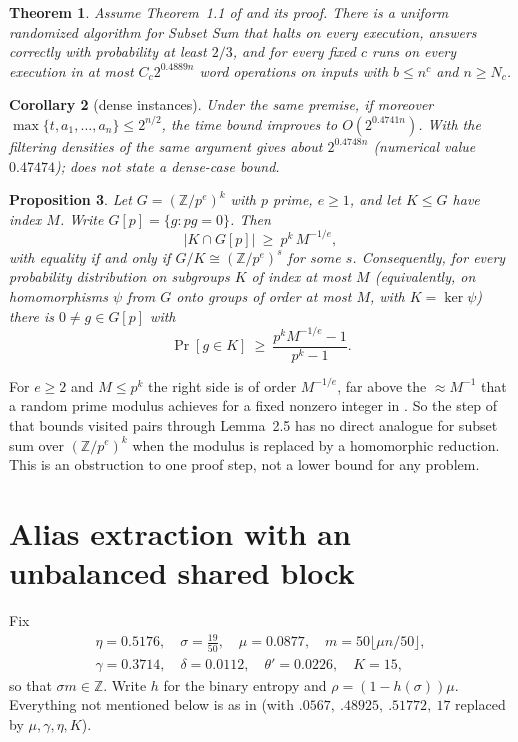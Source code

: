 \documentclass[11pt]{amsart}
\newtheorem{theorem}{Theorem}[section]
\newtheorem{proposition}[theorem]{Proposition}
\newtheorem{corollary}[theorem]{Corollary}
\theoremstyle{remark}
\newcommand{\Z}{\mathbb Z}
\begin{document}
\begin{theorem}\label{thm:main}
Assume Theorem~1.1 of \cite{oai} and its proof. There is a uniform randomized algorithm for Subset
Sum that halts on every execution, answers correctly with probability at least $2/3$, and for every
fixed $c$ runs on every execution in at most $C_c2^{0.4889n}$ word operations on inputs with $b\le n^c$
and $n\ge N_c$.
\end{theorem}

\begin{corollary}[dense instances]\label{cor:dense}
Under the same premise, if moreover $\max\{t,a_1,\dots,a_n\}\le2^{n/2}$, the time bound improves to
$O(2^{0.4741n})$. With the filtering densities of \cite{oai} the same argument gives about
$2^{0.4748n}$ (numerical value $0.47474$); \cite{oai} does not state a dense-case bound.
\end{corollary}

\begin{proposition}\label{prop:C}
Let $G=(\Z/p^e)^k$ with $p$ prime, $e\ge1$, and let $K\le G$ have index $M$. Write
$G[p]=\{g:pg=0\}$. Then
\[
|K\cap G[p]|\ \ge\ p^k\,M^{-1/e},
\]
with equality if and only if $G/K\cong(\Z/p^e)^s$ for some $s$. Consequently, for every probability
distribution on subgroups $K$ of index at most $M$ (equivalently, on homomorphisms $\psi$ from $G$ onto
groups of order at most $M$, with $K=\ker\psi$) there is $0\ne g\in G[p]$ with
\[
\Pr[g\in K]\ \ge\ \frac{p^kM^{-1/e}-1}{p^k-1}.
\]
\end{proposition}

For $e\ge2$ and $M\le p^{k}$ the right side is of order $M^{-1/e}$, far above the $\approx M^{-1}$
that a random prime modulus achieves for a fixed nonzero integer in \cite[Lemma~2.5]{oai}. So the
step of \cite[Section~5]{oai} that bounds visited pairs through Lemma~2.5 has no direct analogue for
subset sum over $(\Z/p^e)^k$ when the modulus is replaced by a homomorphic reduction. This is an
obstruction to one proof step, not a lower bound for any problem.

\section{Alias extraction with an unbalanced shared block}\label{sec:alias}
Fix
\begin{gather*}
\eta=0.5176,\quad \sigma=\tfrac{19}{50},\quad \mu=0.0877,\quad m=50\lfloor\mu n/50\rfloor,\\
\gamma=0.3714,\quad \delta=0.0112,\quad \theta'=0.0226,\quad K=15,
\end{gather*}
so that $\sigma m\in\Z$. Write $h$ for the binary entropy and $\rho=(1-h(\sigma))\mu$. Everything not
mentioned below is as in \cite[Section~5]{oai} (with $.0567,\ .48925,\ .51772,\ 17$ replaced by
$\mu,\gamma,\eta,K$).
\end{document}
